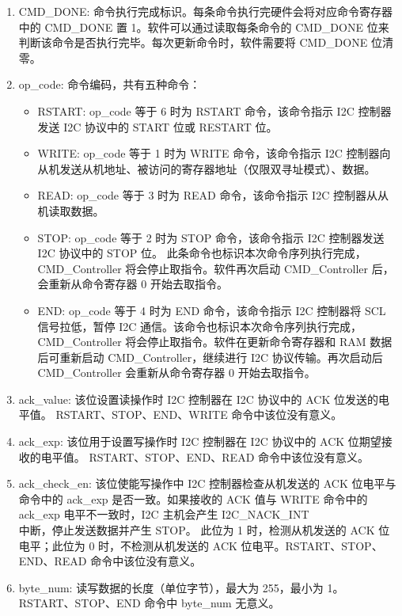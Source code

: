 \documentclass[main\_\_CN.tex]{subfiles}
\begin{document}
\begin{enumerate}

\item CMD\_DONE: 命令执行完成标识。每条命令执行完硬件会将对应命令寄存器中的 CMD\_DONE 置 1。软件可以通过读取每条命令的 CMD\_DONE 位来判断该命令是否执行完毕。每次更新命令时，软件需要将 CMD\_DONE 位清零。

\item op\_code: 命令编码，共有五种命令：

\begin{itemize}
    \item RSTART: op\_code 等于 6 时为 RSTART 命令，该命令指示 I2C 控制器发送 I2C 协议中的 START 位或 RESTART 位。

    \item WRITE: op\_code 等于 1 时为 WRITE 命令，该命令指示 I2C 控制器向从机发送从机地址、被访问的寄存器地址（仅限双寻址模式）、数据。

    \item READ: op\_code 等于 3 时为 READ 命令，该命令指示 I2C 控制器从从机读取数据。

    \item STOP: op\_code 等于 2 时为 STOP 命令，该命令指示 I2C 控制器发送 I2C 协议中的 STOP 位。 此条命令也标识本次命令序列执行完成，CMD\_Controller 将会停止取指令。软件再次启动 CMD\_Controller 后，会重新从命令寄存器 0 开始去取指令。

    \item END: op\_code 等于 4 时为 END 命令，该命令指示 I2C 控制器将 SCL 信号拉低，暂停 I2C 通信。该命令也标识本次命令序列执行完成，CMD\_Controller 将会停止取指令。软件在更新命令寄存器和 RAM 数据后可重新启动 CMD\_Controller，继续进行 I2C 协议传输。再次启动后 CMD\_Controller 会重新从命令寄存器 0 开始去取指令。

\end{itemize}

\item ack\_value: 该位设置读操作时 I2C 控制器在 I2C 协议中的 ACK 位发送的电平值。 RSTART、STOP、END、WRITE 命令中该位没有意义。

\item ack\_exp: 该位用于设置写操作时 I2C 控制器在 I2C 协议中的 ACK 位期望接收的电平值。 RSTART、STOP、END、READ 命令中该位没有意义。

\item ack\_check\_en: 该位使能写操作中 I2C 控制器检查从机发送的 ACK 位电平与命令中的 ack\_exp 是否一致。如果接收的 ACK 值与 WRITE 命令中的 ack\_exp 电平不一致时，I2C 主机会产生 I2C\_NACK\_INT\\ 中断，停止发送数据并产生 STOP。 此位为 1 时，检测从机发送的 ACK 位电平；此位为 0 时，不检测从机发送的 ACK 位电平。RSTART、STOP、END、READ 命令中该位没有意义。

\item byte\_num: 读写数据的长度（单位字节），最大为 255，最小为 1。RSTART、STOP、END 命令中 byte\_num 无意义。

\end{enumerate}
\end{document}
